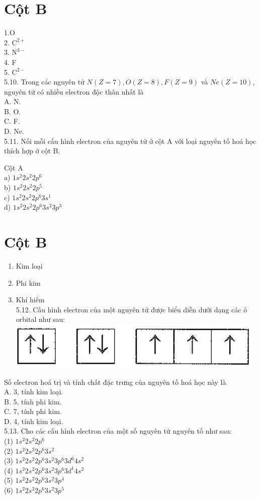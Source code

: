 \documentclass[10pt]{article}
\begin{document}
\section*{Cột B}
1.O\\
2. $\mathrm{C}^{2+}$\\
3. $\mathrm{N}^{3-}$\\
4. F\\
5. $\mathrm{C}^{2-}$\\
5.10. Trong các nguyên tử $N(Z=7), O(Z=8), F(Z=9)$ và $N e(Z=10)$, nguyên tử có nhiều electron độc thân nhất là\\
A. N.\\
B. O.\\
C. F.\\
D. Ne.\\
5.11. Nối mỗi cấu hình electron của nguyên tử ở cột A với loại nguyên tố hoá học thích hợp ở cột B.

Cột A\\
a) $1 s^{2} 2 s^{2} 2 p^{6}$\\
b) $1 s^{2} 2 s^{2} 2 p^{5}$\\
c) $1 s^{2} 2 s^{2} 2 p^{6} 3 s^{1}$\\
d) $1 s^{2} 2 s^{2} 2 p^{6} 3 s^{2} 3 p^{3}$

\section*{Cột B}
\begin{enumerate}
  \item Kim loại
  \item Phi kim
  \item Khí hiếm\\
5.12. Cấu hình electron của một nguyên tử được biểu diễn dưới dạng các ô orbital như sau:\\
\includegraphics[max width=\textwidth, center]{2025_10_23_76620c17ffac1ae9b35bg-13}
\end{enumerate}

Số electron hoá trị và tính chất đặc trưng của nguyên tố hoá học này là\\
A. 3, tính kim loại.\\
B. 5, tính phi kim.\\
C. 7, tính phi kim.\\
D. 4, tính kim loại.\\
5.13. Cho các cấu hình electron của một số nguyên tử nguyên tố như sau:\\
(1) $1 s^{2} 2 s^{2} 2 p^{6}$\\
(2) $1 s^{2} 2 s^{2} 2 p^{6} 3 s^{2}$\\
(3) $1 s^{2} 2 s^{2} 2 p^{6} 3 s^{2} 3 p^{6} 3 d^{6} 4 s^{2}$\\
(4) $1 s^{2} 2 s^{2} 2 p^{6} 3 s^{2} 3 p^{6} 3 d^{1} 4 s^{2}$\\
(5) $1 s^{2} 2 s^{2} 2 p^{6} 3 s^{2} 3 p^{4}$\\
(6) $1 s^{2} 2 s^{2} 2 p^{6} 3 s^{2} 3 p^{5}$
\end{document}
